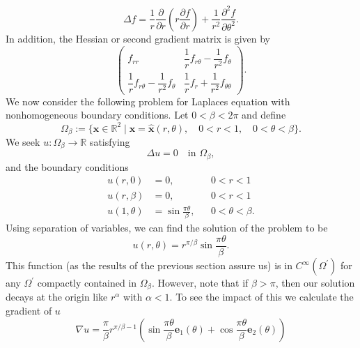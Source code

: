 \begin{Example}
\begin{equation}\label{eq:corner-example-polar-laplacian-formula}
\Delta f=\frac{1}{r}\frac{\partial}{\partial r}\left(r\frac{\partial f}{\partial r}\right)+\frac{1}{r^2}\frac{\partial^2f}{\partial\theta^2}.
\end{equation}
In addition, the Hessian or second gradient matrix is given by
\begin{equation}\label{eq:corner-example-polar-hessian-matrix}
\begin{pmatrix}
f_{rr}&\dfrac{1}{r}f_{r\theta}-\dfrac{1}{r^2}f_\theta\\
\dfrac{1}{r}f_{r\theta}-\dfrac{1}{r^2}f_\theta&\dfrac{1}{r}f_r+\dfrac{1}{r^2}f_{\theta\theta}
\end{pmatrix}.
\end{equation}
We now consider the following problem for Laplace\textquotesingle s equation with nonhomogeneous boundary conditions. Let $0<\beta<2\pi$ and define
\begin{equation}\label{eq:corner-example-planar-sector-domain}
\Omega_\beta:=\{\bm{x}\in\mathbb{R}^2\mid\bm{x}=\widehat{\bm{x}}(r,\theta),\quad0<r<1,\quad0<\theta<\beta\}.
\end{equation}
We seek $u:\Omega_\beta\to\mathbb{R}$ satisfying
\begin{equation}\label{eq:corner-example-harmonic-sector-equation}
\Delta u=0\quad\text{in }\Omega_\beta,
\end{equation}
and the boundary conditions\[\begin{aligned}
u(r,0)&=0,&&0<r<1\\
u(r,\beta)&=0,&&0<r<1\\
u(1,\theta)&=\sin\frac{\pi\theta}{\beta},&&0<\theta<\beta.
\end{aligned}\]Using separation of variables, we can find the solution of the problem to be
\begin{equation}\label{eq:corner-example-explicit-harmonic-sector-solution}
u(r,\theta)=r^{\pi/\beta}\sin\frac{\pi\theta}{\beta}.
\end{equation}
This function (as the results of the previous section assure us) is in $C^\infty(\Omega^{\prime})$ for any $\Omega^{\prime}$ compactly contained in $\Omega_\beta$. However, note that if $\beta>\pi$, then our solution decays at the origin like $r^\alpha$ with $\alpha<1$. To see the impact of this we calculate the gradient of $u$
\begin{equation}\label{eq:corner-example-explicit-solution-gradient}
\nabla u=\frac{\pi}{\beta}r^{\pi/\beta-1}\left(\sin\frac{\pi\theta}{\beta}\bm{e}_1(\theta)+\cos\frac{\pi\theta}{\beta}\bm{e}_2(\theta)\right)

\end{equation}
\end{Example}
